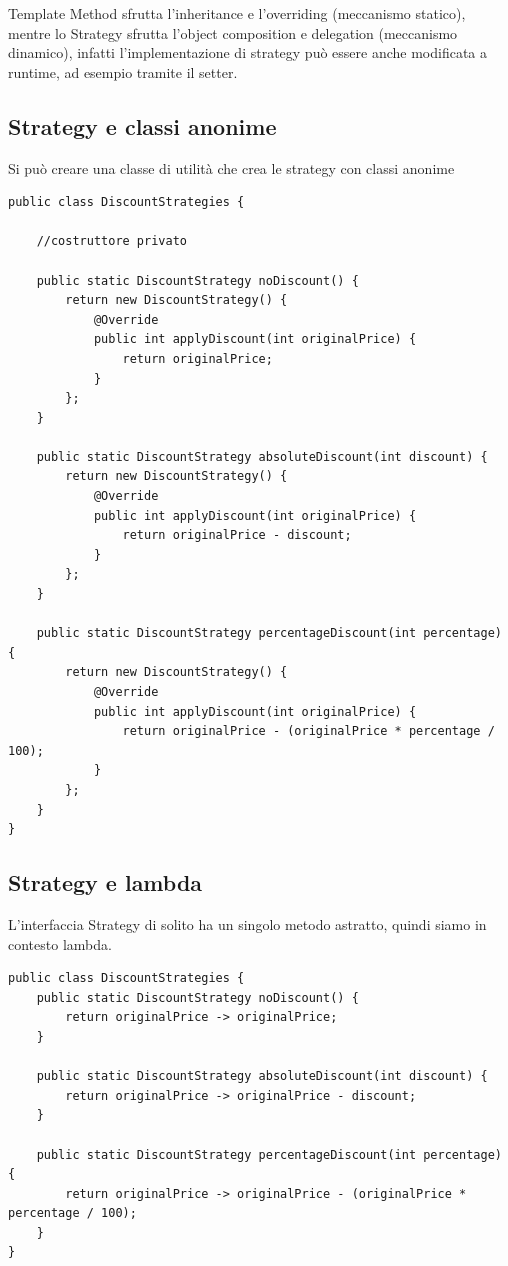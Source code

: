 Template Method sfrutta l’inheritance e l’overriding (meccanismo statico), mentre lo Strategy sfrutta l’object composition e delegation (meccanismo dinamico), 
infatti l’implementazione di strategy può essere anche modificata a runtime, ad esempio tramite il setter.

\subsection{Strategy e classi anonime}

Si può creare una classe di utilità che crea le strategy con classi anonime
\begin{lstlisting}
public class DiscountStrategies {

    //costruttore privato

    public static DiscountStrategy noDiscount() {
        return new DiscountStrategy() {
            @Override
            public int applyDiscount(int originalPrice) {
                return originalPrice;
            }
        };
    }

    public static DiscountStrategy absoluteDiscount(int discount) {
        return new DiscountStrategy() {
            @Override
            public int applyDiscount(int originalPrice) {
                return originalPrice - discount;
            }
        };
    }

    public static DiscountStrategy percentageDiscount(int percentage) {
        return new DiscountStrategy() {
            @Override
            public int applyDiscount(int originalPrice) {
                return originalPrice - (originalPrice * percentage / 100);
            }
        };
    }
}
\end{lstlisting}

\subsection{Strategy e lambda}

L’interfaccia Strategy di solito ha un singolo metodo astratto, quindi siamo in contesto lambda.
\begin{lstlisting}
public class DiscountStrategies {
    public static DiscountStrategy noDiscount() {
        return originalPrice -> originalPrice;
    }

    public static DiscountStrategy absoluteDiscount(int discount) {
        return originalPrice -> originalPrice - discount;
    }

    public static DiscountStrategy percentageDiscount(int percentage) {
        return originalPrice -> originalPrice - (originalPrice * percentage / 100);
    }
}
\end{lstlisting}